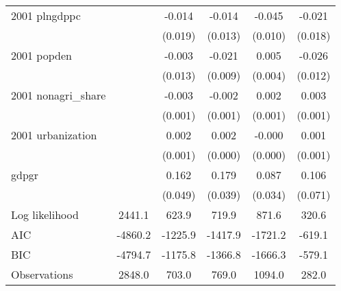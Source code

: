 \begin{table}[htbp]
\begin{tabular}{l*{5}{c}}
2001 plngdppc       &                     &      -0.014         &      -0.014         &      -0.045\sym{***}&      -0.021         \\
                    &                     &     (0.019)         &     (0.013)         &     (0.010)         &     (0.018)         \\
2001 popden         &                     &      -0.003         &      -0.021\sym{**} &       0.005         &      -0.026\sym{**} \\
                    &                     &     (0.013)         &     (0.009)         &     (0.004)         &     (0.012)         \\
2001 nonagri\_share  &                     &      -0.003\sym{***}&      -0.002\sym{**} &       0.002\sym{***}&       0.003\sym{***}\\
                    &                     &     (0.001)         &     (0.001)         &     (0.001)         &     (0.001)         \\
2001 urbanization   &                     &       0.002\sym{***}&       0.002\sym{***}&      -0.000         &       0.001         \\
                    &                     &     (0.001)         &     (0.000)         &     (0.000)         &     (0.001)         \\
gdpgr               &                     &       0.162\sym{***}&       0.179\sym{***}&       0.087\sym{**} &       0.106         \\
                    &                     &     (0.049)         &     (0.039)         &     (0.034)         &     (0.071)         \\
\hline
Log likelihood      &      2441.1         &       623.9         &       719.9         &       871.6         &       320.6         \\
AIC                 &     -4860.2         &     -1225.9         &     -1417.9         &     -1721.2         &      -619.1         \\
BIC                 &     -4794.7         &     -1175.8         &     -1366.8         &     -1666.3         &      -579.1         \\
Observations        &      2848.0         &       703.0         &       769.0         &      1094.0         &       282.0         \\
\hline\hline
\end{tabular}
\end{table}
